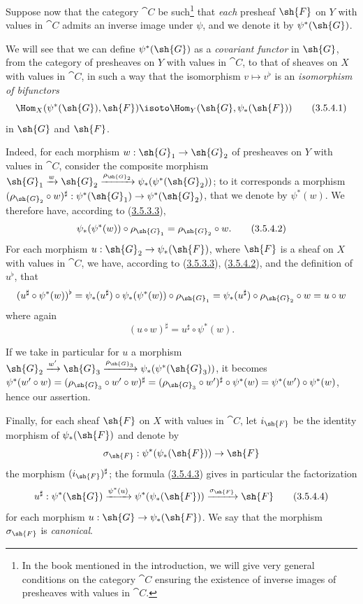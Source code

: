 \begin{env}[3.5.4]
\label{0.3.5.4}
Suppose now that the category $\cat{C}$ be such\footnote{In the book mentioned in the
introduction, we will give very general conditions on the category $\cat{C}$ ensuring
the existence of inverse images of presheaves with values in $\cat{C}$.} that
\emph{each} presheaf $\sh{F}$ on $Y$ with values in $\cat{C}$ admits an inverse image
under $\psi$, and we denote it by $\psi^*(\sh{G})$.

We will see that we can define $\psi^*(\sh{G})$ as a \emph{covariant functor} in
$\sh{G}$, from the category of presheaves on $Y$ with values in $\cat{C}$, to that of
sheaves on $X$ with values in $\cat{C}$, in such a way that the isomorphism
$v\mapsto v^\flat$ is an \emph{isomorphism of bifunctors}
\[
  \Hom_X(\psi^*(\sh{G}),\sh{F})\isoto\Hom_Y(\sh{G},\psi_*(\sh{F}))
  \tag{3.5.4.1}
\]
in $\sh{G}$ and $\sh{F}$.

Indeed, for each morphism $w:\sh{G}_1\to\sh{G}_2$ of presheaves on $Y$ with
values in $\cat{C}$, consider the composite morphism
$\sh{G}_1\xrightarrow{w}\sh{G}_2
  \xrightarrow{\rho_{\sh{G}_2}}\psi_*(\psi^*(\sh{G}_2))$; to it corresponds a
morphism $(\rho_{\sh{G}_2}\circ w)^\sharp:\psi^*(\sh{G}_1)\to\psi^*(\sh{G}_2)$,
that we denote by $\psi^*(w)$. We therefore have, according to (\hyperref[0.3.5.3.3]{3.5.3.3}),
\[
  \psi_*(\psi^*(w))\circ\rho_{\sh{G}_1}=\rho_{\sh{G}_2}\circ w.
  \tag{3.5.4.2}\label{0.3.5.4.2}
\]
For each morphism $u:\sh{G}_2\to\psi_*(\sh{F})$, where $\sh{F}$ is a sheaf on
$X$ with values in $\cat{C}$, we have, according to (\hyperref[0.3.5.3.3]{3.5.3.3}), (\hyperref[0.3.5.4.2]{3.5.4.2}), and the
definition of $u^\flat$, that
\[
  (u^\sharp\circ\psi^*(w))^\flat
  =\psi_*(u^\sharp)\circ\psi_*(\psi^*(w))\circ\rho_{\sh{G}_1}
  =\psi_*(u^\sharp)\circ\rho_{\sh{G}_2}\circ w=u\circ w
\]
where again
\[
  (u\circ w)^\sharp=u^\sharp\circ\psi^*(w).
  \tag{3.5.4.3}\label{0.3.5.4.3}
\]

If we take in particular for $u$ a morphism
$\sh{G}_2\xrightarrow{w'}\sh{G}_3
  \xrightarrow{\rho_{\sh{G}_3}}\psi_*(\psi^*(\sh{G}_3))$, it becomes
$\psi^*(w'\circ w)=(\rho_{\sh{G}_3}\circ w'\circ w)^\sharp
  =(\rho_{\sh{G}_3}\circ w')^\sharp\circ\psi^*(w)=\psi^*(w')\circ\psi^*(w)$,
hence our assertion.

Finally, for each sheaf $\sh{F}$ on $X$ with values in $\cat{C}$, let $i_\sh{F}$ be
the identity morphism of $\psi_*(\sh{F})$ and denote by
\[
  \sigma_\sh{F}:\psi^*(\psi_*(\sh{F}))\to\sh{F}
\]
the morphism $(i_\sh{F})^\sharp$; the formula (\hyperref[0.3.5.4.3]{3.5.4.3}) gives in particular the
factorization
\[
\label{0.3.5.4.4}
  u^\sharp:\psi^*(\sh{G})\xrightarrow{\psi^*(u)}\psi^*(\psi_*(\sh{F}))
  \xrightarrow{\sigma_\sh{F}}\sh{F}
  \tag{3.5.4.4}
\]
for each morphism $u:\sh{G}\to\psi_*(\sh{F})$. We say that the morphism
$\sigma_\sh{F}$ is \emph{canonical}.
\end{env}


